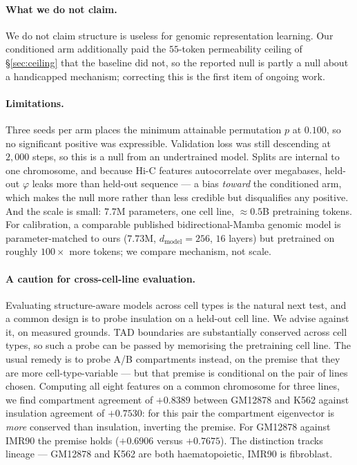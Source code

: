 \documentclass[10pt]{article}
\begin{document}
\paragraph{What we do not claim.} We do not claim structure is useless for
genomic representation learning. Our conditioned arm additionally paid the
$55$-token permeability ceiling of \S\ref{sec:ceiling} that the baseline did not,
so the reported null is partly a null about a handicapped mechanism; correcting
this is the first item of ongoing work.

\paragraph{Limitations.} Three seeds per arm places the minimum attainable
permutation $p$ at $0.100$, so no significant positive was expressible.
Validation loss was still descending at $2{,}000$ steps, so this is a null from
an undertrained model. Splits are internal to one chromosome, and because Hi-C
features autocorrelate over megabases, held-out $\varphi$ leaks more than
held-out sequence --- a bias \emph{toward} the conditioned arm, which makes the
null more rather than less credible but disqualifies any positive. And the scale
is small: $7.7$M parameters, one cell line, $\approx\!0.5$B pretraining tokens.
For calibration, a comparable published bidirectional-Mamba genomic model is
parameter-matched to ours ($7.73$M, $d_{\text{model}}=256$, $16$ layers) but
pretrained on roughly $100\times$ more tokens; we compare mechanism, not scale.

\paragraph{A caution for cross-cell-line evaluation.}
Evaluating structure-aware models across cell types is the natural next test,
and a common design is to probe insulation on a held-out cell line. We advise
against it, on measured grounds. TAD boundaries are substantially conserved
across cell types, so such a probe can be passed by memorising the pretraining
cell line. The usual remedy is to probe A/B compartments instead, on the premise
that they are more cell-type-variable --- but that premise is conditional on the
pair of lines chosen. Computing all eight features on a common chromosome for
three lines, we find compartment agreement of $+0.8389$ between GM12878 and
K562 against insulation agreement of $+0.7530$: for this pair the compartment
eigenvector is \emph{more} conserved than insulation, inverting the premise.
For GM12878 against IMR90 the premise holds ($+0.6906$ versus $+0.7675$). The
distinction tracks lineage --- GM12878 and K562 are both haematopoietic, IMR90
is fibroblast.
\end{document}
